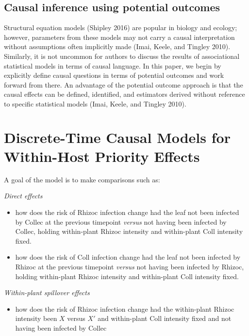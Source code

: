 \documentclass[]{article}
\providecommand{\tightlist}{%
  \setlength{\itemsep}{0pt}\setlength{\parskip}{0pt}}
\begin{document}
\hypertarget{causal-inference-using-potential-outcomes}{%
\subsection{Causal inference using potential
outcomes}\label{causal-inference-using-potential-outcomes}}

Structural equation models (Shipley 2016) are popular in biology and
ecology; however, parameters from these models may not carry a causal
interpretation without assumptions often implicitly made (Imai, Keele,
and Tingley 2010). Similarly, it is not uncommon for authors to discuss
the results of associational statistical models in terms of causal
language. In this paper, we begin by explicitly define causal questions
in terms of potential outcomes and work forward from there. An advantage
of the potential outcome approach is that the causal effects can be
defined, identified, and estimators derived without reference to
specific statistical models (Imai, Keele, and Tingley 2010).

\hypertarget{discrete-time-causal-models-for-within-host-priority-effects}{%
\section{Discrete-Time Causal Models for Within-Host Priority
Effects}\label{discrete-time-causal-models-for-within-host-priority-effects}}

A goal of the model is to make comparisons such as:

\emph{Direct effects}

\begin{itemize}
\tightlist
\item
  how does the risk of Rhizoc infection change had the leaf not been
  infected by Collec at the previous timepoint \emph{versus} not having
  been infected by Collec, holding within-plant Rhizoc intensity and
  within-plant Coll intensity fixed.
\item
  how does the risk of Coll infection change had the leaf not been
  infected by Rhizoc at the previous timepoint \emph{versus} not having
  been infected by Rhizoc, holding within-plant Rhizoc intensity and
  within-plant Coll intensity fixed.
\end{itemize}

\emph{Within-plant spillover effects}

\begin{itemize}
\tightlist
\item
  how does the risk of Rhizoc infection change had the within-plant
  Rhizoc intensity been \(X\) versus \(X'\) and within-plant Coll
  intensity fixed and not having been infected by Collec
\end{itemize}
\end{document}
